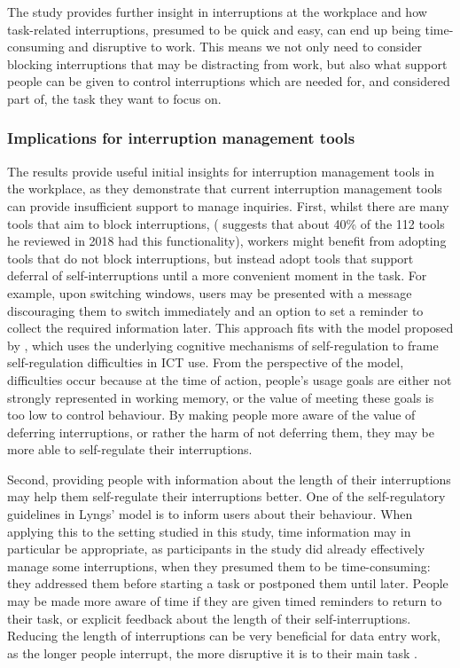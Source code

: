 The study provides further insight in interruptions at the workplace and how task-related interruptions, presumed to be quick and easy, can end up being time-consuming and disruptive to work. This means we not only need to consider blocking interruptions that may be distracting from work, but also what support people can be given to control interruptions which are needed for, and considered part of, the task they want to focus on.

\subsubsection{Implications for interruption management tools}
The results provide useful initial insights for interruption management tools in the workplace, as they demonstrate that current interruption management tools can provide insufficient support to manage inquiries. First, whilst there are many tools that aim to block interruptions, (\citet{Lyngs2018} suggests that about 40\% of the 112 tools he reviewed in 2018 had this functionality), workers might benefit from adopting tools that do not block interruptions, but instead adopt tools that support deferral of self-interruptions until a more convenient moment in the task. For example, upon switching windows, users may be presented with a message discouraging them to switch immediately and an option to set a reminder to collect the required information later. This approach fits with the model proposed by \citet{Lyngs2018}, which uses the underlying cognitive mechanisms of self-regulation to frame self-regulation difficulties in ICT use. From the perspective of the model, difficulties occur because at the time of action, people's usage goals are either not strongly represented in working memory, or the value of meeting these goals is too low to control behaviour. By making people more aware of the value of deferring interruptions, or rather the harm of not deferring them, they may be more able to self-regulate their interruptions. 

Second, providing people with information about the length of their interruptions may help them self-regulate their interruptions better. One of the self-regulatory guidelines in Lyngs' model is to inform users about their behaviour. When applying this to the setting studied in this study, time information may in particular be appropriate, as participants in the study did already effectively manage some interruptions, when they presumed them to be time-consuming: they addressed them before starting a task or postponed them until later. People may be made more aware of time if they are given timed reminders to return to their task, or explicit feedback about the length of their self-interruptions. Reducing the length of interruptions can be very beneficial for data entry work, as the longer people interrupt, the more disruptive it is to their main task \citep{Altmann2017}.


